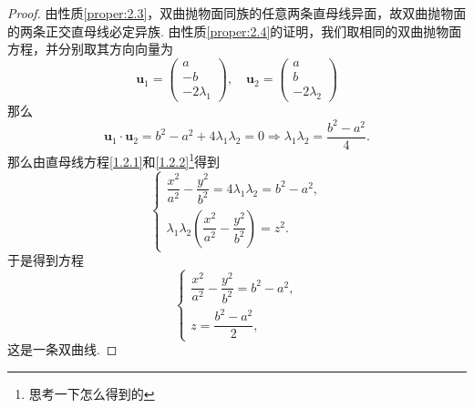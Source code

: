 \documentclass[12pt, a4paper,newtx]{ctexart}
\begin{document}
\begin{proof}
	由性质\ref{proper:2.3}，双曲抛物面同族的任意两条直母线异面，故双曲抛物面的两条正交直母线必定异族. 由性质\ref{proper:2.4}的证明，我们取相同的双曲抛物面方程，并分别取其方向向量为
	\[
	\bm{u}_1 = \begin{pmatrix}
		a \\
		-b \\
		-2\lambda_1
	\end{pmatrix},\quad\bm{u}_2 = \begin{pmatrix}
	a \\
	b \\
	-2\lambda_2
	\end{pmatrix}
	\]
	那么
	\[
	\bm{u}_1 \cdot \bm{u}_2 = b^2 - a^2 + 4\lambda_1 \lambda_2 = 0 \Longrightarrow \lambda_1 \lambda_2 = \frac{b^2 - a^2}{4}.
	\]
	那么由直母线方程\eqref{1.2.1}和\eqref{1.2.2}\footnote{思考一下怎么得到的}得到
	\[\begin{cases}
		\dfrac{x^2}{a^2} - \dfrac{y^2}{b^2} = 4\lambda_1 \lambda_2 = b^2 - a^2,\\[5pt]\lambda_1 \lambda_2 \left( \dfrac{x^2}{a^2} - \dfrac{y^2}{b^2} \right) = z^2.
	\end{cases}\]
	于是得到方程
	\[
	\begin{cases}
		\dfrac{x^2}{a^2} - \dfrac{y^2}{b^2} = b^2 - a^2, \\[5pt]
		z = \dfrac{b^2 - a^2}{2},
	\end{cases} 
	\]
	这是一条双曲线. 
\end{proof}
\end{document}
